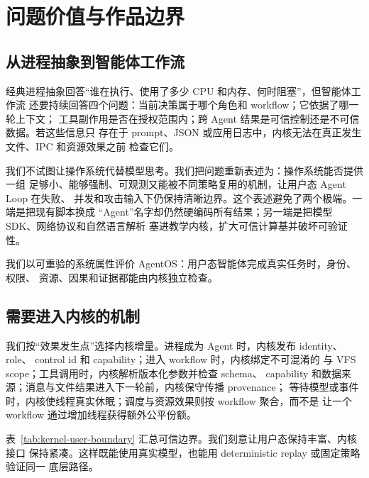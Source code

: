 \chapter{问题价值与作品边界}
\label{chap:value-boundary}

\section{从进程抽象到智能体工作流}

经典进程抽象回答“谁在执行、使用了多少 CPU 和内存、何时阻塞”，但智能体工作流
还要持续回答四个问题：当前决策属于哪个角色和 workflow；它依据了哪一轮上下文；
工具副作用是否在授权范围内；跨 Agent 结果是可信控制还是不可信数据。若这些信息只
存在于 prompt、JSON 或应用日志中，内核无法在真正发生文件、IPC 和资源效果之前
检查它们。

我们不试图让操作系统代替模型思考。我们把问题重新表述为：操作系统能否提供一组
足够小、能够强制、可观测又能被不同策略复用的机制，让用户态 Agent Loop 在失败、
并发和攻击输入下仍保持清晰边界。这个表述避免了两个极端。一端是把现有脚本换成
“Agent”名字却仍然硬编码所有结果；另一端是把模型 SDK、网络协议和自然语言解析
塞进教学内核，扩大可信计算基并破坏可验证性。

\begin{designbox}[我们的价值判断]
我们以可重验的系统属性评价 AgentOS：用户态智能体完成真实任务时，身份、权限、
资源、因果和证据都能由内核独立检查。
\end{designbox}

\section{需要进入内核的机制}

我们按“效果发生点”选择内核增量。进程成为 Agent 时，内核发布 identity、role、
control id 和 capability；进入 workflow 时，内核绑定不可混淆的
 与 VFS scope；工具调用时，内核解析版本化参数并检查 schema、
capability 和数据来源；消息与文件结果进入下一轮前，内核保守传播 provenance；
等待模型或事件时，内核使线程真实休眠；调度与资源效果则按 workflow 聚合，而不是
让一个 workflow 通过增加线程获得额外公平份额。

表~\ref{tab:kernel-user-boundary} 汇总可信边界。我们刻意让用户态保持丰富、内核接口
保持紧凑。这样既能使用真实模型，也能用 deterministic replay 或固定策略验证同一
底层路径。

